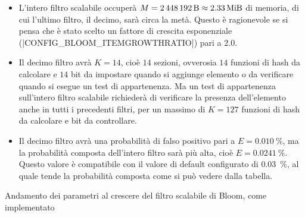 \medskip
\begin{itemize}
  \item L'intero filtro scalabile occuperà $M = \SI{2448192}{\byte} \approx \SI{2.33}{\mebi\byte}$
  di memoria, di cui l'ultimo filtro, il decimo, sarà circa la metà. Questo è ragionevole se si
  pensa che è stato scelto un fattore di crescita esponenziale (\cverb|CONFIG_BLOOM_ITEMGROWTHRATIO|)
  pari a $2.0$.

  \item Il decimo filtro avrà $K=14$, cioè $14$ sezioni, ovverosia $14$ funzioni di hash da
  calcolare e $14$ bit da impostare quando si aggiunge elemento o da verificare quando si esegue un
  test di appartenenza. Ma un test di appartenenza sull'intero filtro scalabile richiederà di
  verificare la presenza dell'elemento anche in tutti i precedenti filtri, per un massimo di $K=127$
  funzioni di hash da calcolare e bit da controllare.

  \item Il decimo filtro avrà una probabilità di falso positivo pari a $E = \SI{0.010}{\%}$, ma la
  probabilità composta dell'intero filtro sarà più alta, cioè $E = \SI{0.0241}{\%}$. Questo valore è
  compatibile con il valore di default configurato di \SI{0.03}{\%}, al quale tende la probabilità
  composta come si può vedere dalla tabella.
\end{itemize}

\begin{table}[htb]
  \resizebox{\textwidth}{!}{%
  }
  \caption{Andamento dei parametri al crescere del filtro scalabile di Bloom, come implementato}
  \label{tbl:scalingbloomparms}
\end{table}

